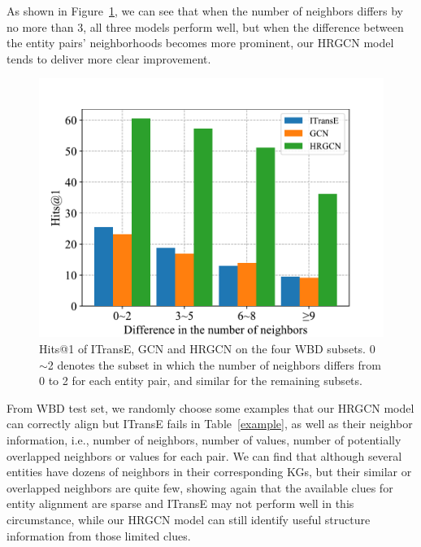 	As shown in Figure~\ref{subset}, we can see that when the number of neighbors differs by no more than 3, all three models perform well,
	but when the difference between the entity pairs' neighborhoods becomes more prominent,
	our HRGCN model tends to deliver more clear improvement.
	\begin{figure}
		\centering
		\includegraphics[width=1\linewidth]{figures/graph4.pdf}
		\caption{Hits@1 of ITransE, GCN and HRGCN on the four WBD subsets. 0$\sim$2 denotes the subset in which the number of neighbors differs from 0 to 2 for each entity pair, and similar for the remaining subsets.}
		\label{subset}
	\end{figure}
	From WBD test set, we randomly choose some examples that our HRGCN model can correctly align but ITransE fails in Table~\ref{example}, as well as their neighbor information, i.e., number of neighbors, number of values, number of potentially overlapped neighbors or values for each pair.
	We can find that although several entities have dozens of neighbors in their corresponding KGs, but their similar or overlapped neighbors are quite few, showing again that
	the available clues for entity alignment are sparse and ITransE may not perform well in this circumstance, while our HRGCN model can still identify useful structure information from those limited clues.
	
